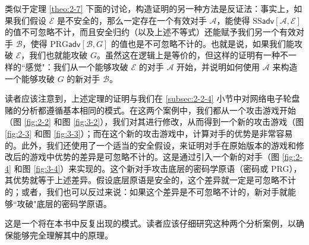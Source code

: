 类似于定理 \ref{theo:2-7} 下面的讨论，构造证明的另一种方法是反证法：事实上，如果我们假设 $\mathcal E$ 是不安全的，那么一定存在一个有效对手 $\mathcal A$，能使得 $\mathrm{SS}\mathsf{adv}[\mathcal{A},\mathcal{E}]$ 的值不可忽略不计，而且安全归约（以及上述不等式）还能赋予我们另一个有效对手 $\mathcal B$，使得 $\mathrm{PRG}\mathsf{adv}[\mathcal{B},G]$ 的值也是不可忽略不计的。也就是说，如果我们能攻破 $\mathcal E$，我们也就能攻破 $G$。虽然这在逻辑上是等价的，但这样的证明有一种不一样的``感觉"：我们从一个能够攻破 $\mathcal E$ 的对手 $\mathcal A$ 开始，并说明如何使用 $\mathcal A$ 来构造一个能够攻破 $G$ 的新对手 $\mathcal B$。

读者应该注意到，上述定理的证明与我们在 \ref{subsec:2-2-4} 小节中对网络电子轮盘赌的分析都遵循基本相同的模式。在这两个案例中，我们都从一个攻击游戏开始（图 \ref{fig:2-2} 和图 \ref{fig:3-2}），我们对其进行修改，从而得到一个新的攻击游戏（图 \ref{fig:2-3} 和图 \ref{fig:3-3}）；而在这个新的攻击游戏中，计算对手的优势是非常容易的。此外，我们还使用了一个适当的安全假设，来证明对手在原始版本的游戏和修改后的游戏中优势的差异是可忽略不计的。这是通过引入一个新的对手（图 \ref{fig:2-4} 和图 \ref{fig:3-4}）来实现的。这个新对手攻击底层的密码学原语（密码或 PRG），其优势就等于上述差异。假设底层原语是安全的，这个差异就一定是可忽略不计的；或者，我们也可以反过来说：如果这个差异是不可忽略不计的，新对手就能够``攻破"底层的密码学原语。

这是一个将在本书中反复出现的模式。读者应该仔细研究这种两个分析案例，以确保能够完全理解其中的原理。
